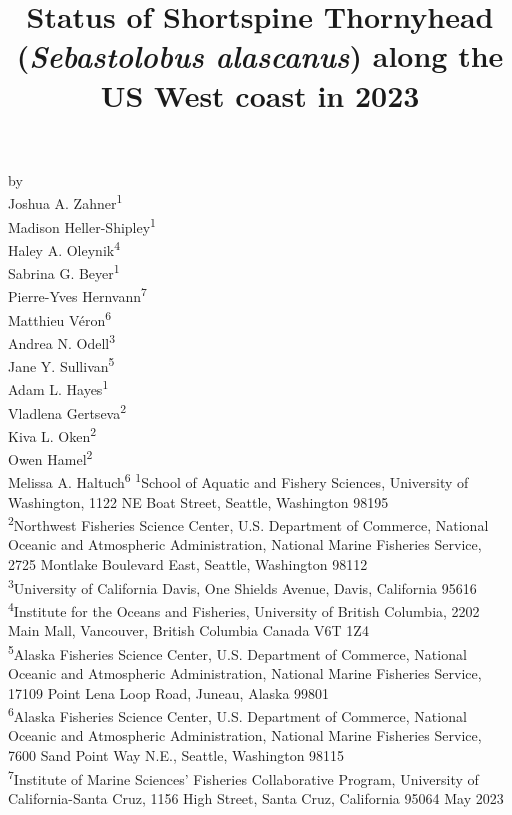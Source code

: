 \documentclass[11pt,
  english,
  letterpaper,
]{article}
\date{}
\newcommand{\trTitle}{Status of Shortspine Thornyhead (\emph{Sebastolobus alascanus}) along the US West coast in 2023}
\newcommand{\trYear}{2023}
\newcommand{\trMonth}{May}
\begin{document}

\renewcommand*{\thefootnote}{\fnsymbol{footnote}}

\small
\thispagestyle{empty}
\noindent
\begin{center}
\title{Status of Shortspine Thornyhead (\emph{Sebastolobus alascanus}) along the US West coast in 2023}
\vspace{1.5cm}
{\Large\textbf{}}
\vfill
by\\
Joshua A. Zahner\textsuperscript{1}\\
Madison Heller-Shipley\textsuperscript{1}\\
Haley A. Oleynik\textsuperscript{4}\\
Sabrina G. Beyer\textsuperscript{1}\\
Pierre-Yves Hernvann\textsuperscript{7}\\
Matthieu Véron\textsuperscript{6}\\
Andrea N. Odell\textsuperscript{3}\\
Jane Y. Sullivan\textsuperscript{5}\\
Adam L. Hayes\textsuperscript{1}\\
Vladlena Gertseva\textsuperscript{2}\\
Kiva L. Oken\textsuperscript{2}\\
Owen Hamel\textsuperscript{2}\\
Melissa A. Haltuch\textsuperscript{6}\vfill
\textsuperscript{1}School of Aquatic and Fishery Sciences, University of Washington, 1122 NE Boat Street, Seattle, Washington 98195\\
\textsuperscript{2}Northwest Fisheries Science Center, U.S. Department of Commerce, National Oceanic and Atmospheric Administration, National Marine Fisheries Service, 2725 Montlake Boulevard East, Seattle, Washington 98112\\
\textsuperscript{3}University of California Davis, One Shields Avenue, Davis, California 95616\\
\textsuperscript{4}Institute for the Oceans and Fisheries, University of British Columbia, 2202 Main Mall, Vancouver, British Columbia Canada V6T 1Z4\\
\textsuperscript{5}Alaska Fisheries Science Center, U.S. Department of Commerce, National Oceanic and Atmospheric Administration, National Marine Fisheries Service, 17109 Point Lena Loop Road, Juneau, Alaska 99801\\
\textsuperscript{6}Alaska Fisheries Science Center, U.S. Department of Commerce, National Oceanic and Atmospheric Administration, National Marine Fisheries Service, 7600 Sand Point Way N.E., Seattle, Washington 98115\\
\textsuperscript{7}Institute of Marine Sciences' Fisheries Collaborative Program, University of California-Santa Cruz, 1156 High Street, Santa Cruz, California 95064\vfill
\trMonth{} \trYear{}
\end{center}
\clearpage
\end{document}
